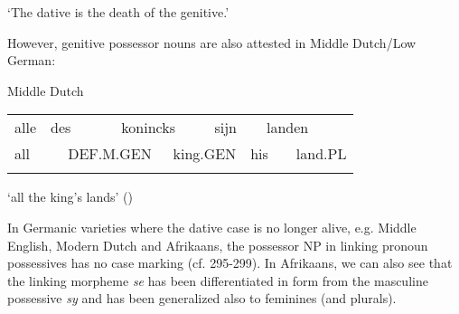 \begin{styleTranslation}
 ‘The dative is the death of the genitive.’

\end{styleTranslation}

\begin{styleBodyTextFirst}
 However, genitive possessor nouns are also attested in Middle Dutch/Low German:

\end{styleBodyTextFirst}

\begin{listWWNumileveli}
\item {}

\begin{styleExample}
Middle Dutch

\end{styleExample}

\end{listWWNumileveli}

\begin{tabular}{llllllllll}
\lsptoprule
alle & \multicolumn{2}{l}{des

} & \multicolumn{2}{l}{konincks

} & \multicolumn{2}{l}{sijn

} & \multicolumn{2}{l}{landen

} & \\
\multicolumn{2}{l}{all

} & \multicolumn{2}{l}{DEF.M.GEN

} & \multicolumn{2}{l}{king.GEN

} & \multicolumn{2}{l}{his

} & \multicolumn{2}{l}{land.PL

}\\
\lspbottomrule
\end{tabular}

\begin{styleTranslation}
‘all the king’s lands’ (\citet[58]{Norde1997})

\end{styleTranslation}

\begin{styleBodyTextFirst}
In Germanic varieties where the dative case is no longer alive, e.g. Middle English, Modern Dutch and Afrikaans, the possessor NP in linking pronoun possessives has no case marking (cf. 295{}-299). In Afrikaans, we can also see that the linking morpheme \textit{se} has been differentiated in form from the masculine possessive \textit{sy} and has been generalized also to feminines (and plurals).

\end{styleBodyTextFirst}

